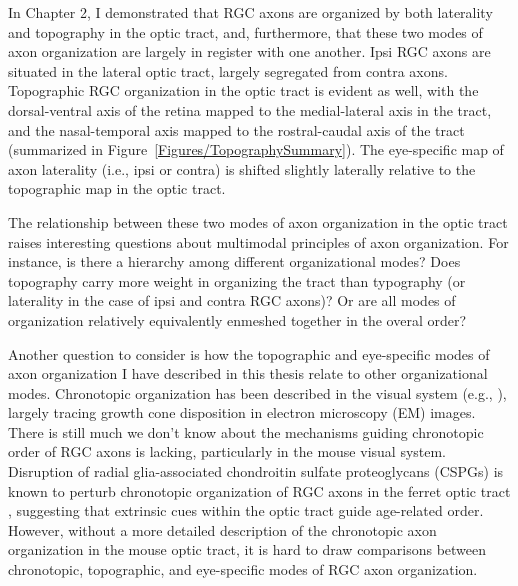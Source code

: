 In Chapter 2, I demonstrated that RGC axons are organized by both laterality and topography in the optic tract, and, furthermore, that these two modes of axon organization are largely in register with one another.
Ipsi RGC axons are situated in the lateral optic tract, largely segregated from contra axons.
Topographic RGC organization in the optic tract is evident as well, with the dorsal-ventral axis of the retina mapped to the medial-lateral axis in the tract, and the nasal-temporal axis mapped to the rostral-caudal axis of the tract (summarized in Figure~\ref{Figures/TopographySummary}).
The eye-specific map of axon laterality (i.e., ipsi or contra) is shifted slightly laterally relative to the topographic map in the optic tract.

The relationship between these two modes of axon organization in the optic tract raises interesting questions about multimodal principles of axon organization.
For instance, is there a hierarchy among different organizational modes?
Does topography carry more weight in organizing the tract than typography (or laterality in the case of ipsi and contra RGC axons)?
Or are all modes of organization relatively equivalently enmeshed together in the overal order?

Another question to consider is how the topographic and eye-specific modes of axon organization I have described in this thesis relate to other organizational modes.
Chronotopic organization has been described in the visual system (e.g., ), largely tracing growth cone disposition in electron microscopy (EM) images.
There is still much we don't know about the mechanisms guiding chronotopic order of RGC axons is lacking, particularly in the mouse visual system.
Disruption of radial glia-associated chondroitin sulfate proteoglycans (CSPGs) is known to perturb chronotopic organization of RGC axons in the ferret optic tract \cite{reese1997chronotopic,leung2003enzymatic}, suggesting that extrinsic cues within the optic tract guide age-related order.
However, without a more detailed description of the chronotopic axon organization in the mouse optic tract, it is hard to draw comparisons between chronotopic, topographic, and eye-specific modes of RGC axon organization.

